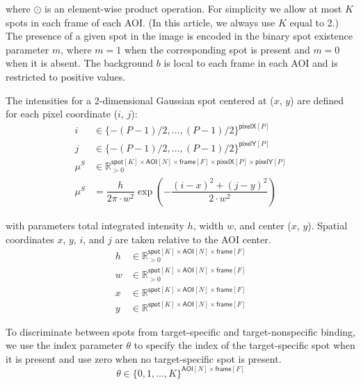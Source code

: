 \noindent
where $\odot$ is an element-wise product operation. For simplicity we allow at most $K$ spots in each frame of each AOI.  (In this article, we always use $K$ equal to 2.)  The presence of a given spot in the image is encoded in the binary spot existence parameter $m$, where $m = 1$ when the corresponding spot is present and $m = 0$ when it is absent. The background $b$ is local to each frame in each AOI and is restricted to positive values.



The intensities for a 2-dimensional Gaussian spot centered at ($x$, $y$) are defined for each pixel coordinate ($i$, $j$):
%
\begin{subequations}
\begin{align}
    i &\in \{-(P-1)/2, \dots, (P-1)/2\}^{\mathsf{pixelX}[P]} \\
    j &\in \{-(P-1)/2, \dots, (P-1)/2\}^{\mathsf{pixelY}[P]} \\
    \mu^S &\in \mathbb{R}_{>0}^{\mathsf{spot}[K] \times \mathsf{AOI}[N] \times \mathsf{frame}[F] \times \mathsf{pixelX}[P] \times \mathsf{pixelY}[P]}  \\
    \mu^S &= \dfrac{h}{2 \pi \cdot w^2} \exp{\left( -\dfrac{(i-x)^2 + (j-y)^2}{2 \cdot w^2} \right)}
\end{align}
\end{subequations}

\noindent
with parameters total integrated intensity $h$, width $w$, and center ($x$, $y$). Spatial coordinates $x$, $y$, $i$, and $j$ are taken relative to the AOI center. 
%
\begin{subequations}
\begin{align}
    h &\in \mathbb{R}_{>0}^{\mathsf{spot}[K] \times \mathsf{AOI}[N] \times \mathsf{frame}[F]} \\
    w &\in \mathbb{R}_{>0}^{\mathsf{spot}[K] \times \mathsf{AOI}[N] \times \mathsf{frame}[F]} \\
    x &\in \mathbb{R}^{\mathsf{spot}[K] \times \mathsf{AOI}[N] \times \mathsf{frame}[F]} \\
    y &\in \mathbb{R}^{\mathsf{spot}[K] \times \mathsf{AOI}[N] \times \mathsf{frame}[F]}
\end{align}
\end{subequations}

To discriminate between spots from target-specific and target-nonspecific binding, we use the index parameter $\theta$ to specify the index of the target-specific spot when it is present and use zero when no target-specific spot is present.
%
\begin{equation}
    \theta \in \{ 0, 1, \dots, K \}^{ \mathsf{AOI}[N] \times \mathsf{frame}[F] }
\end{equation}

